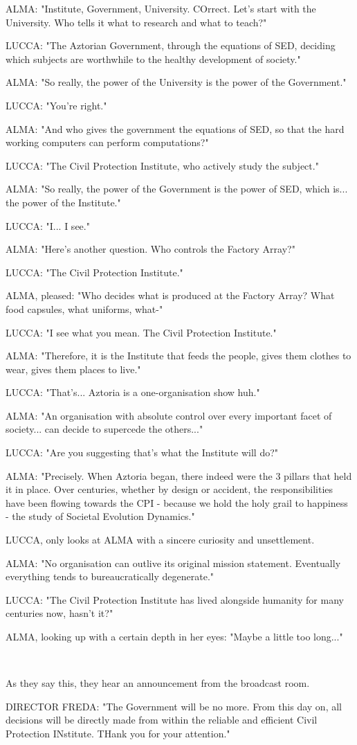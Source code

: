 \documentclass[11pt]{article}
\begin{document}
ALMA: "Institute, Government, University. COrrect.
Let's start with the University.
Who tells it what to research and what to teach?"

LUCCA: "The Aztorian Government, through the equations of SED, deciding which subjects are worthwhile to the healthy development of society."

ALMA: "So really, the power of the University is the power of the Government."

LUCCA: "You're right."

ALMA: "And who gives the government the equations of SED, so that the hard working computers can perform computations?"

LUCCA: "The Civil Protection Institute, who actively study the subject."

ALMA: "So really, the power of the Government is the power of SED, which is... the power of the Institute."

LUCCA: "I... I see."

ALMA: "Here's another question. 
Who controls the Factory Array?"

LUCCA: "The Civil Protection Institute."

ALMA, pleased: "Who decides what is produced at the Factory Array?
What food capsules, what uniforms, what-"

LUCCA: "I see what you mean. The Civil Protection Institute."

ALMA: "Therefore, it is the Institute that feeds the people, gives them clothes to wear, gives them places to live."

LUCCA: "That's... Aztoria is a one-organisation show huh."

ALMA: "An organisation with absolute control over every important facet of society... can decide to supercede the others..."

LUCCA: "Are you suggesting that's what the Institute will do?"

ALMA: "Precisely.
When Aztoria began, there indeed were the 3 pillars that held it in place. 
Over centuries, whether by design or accident, the responsibilities have been flowing towards the CPI - because we hold the holy grail to happiness - the study of Societal Evolution Dynamics."

LUCCA, only looks at ALMA with a sincere curiosity and unsettlement.

ALMA: "No organisation can outlive its original mission statement. Eventually everything tends to bureaucratically degenerate."

LUCCA: "The Civil Protection Institute has lived alongside humanity for many centuries now, hasn't it?"

ALMA, looking up with a certain depth in her eyes: "Maybe a little too long..."

\ 

As they say this, they hear an announcement from the broadcast room.

DIRECTOR FREDA: "The Government will be no more. 
From this day on, all decisions will be directly made from within the reliable and efficient Civil Protection INstitute.
THank you for your attention."
\end{document}
